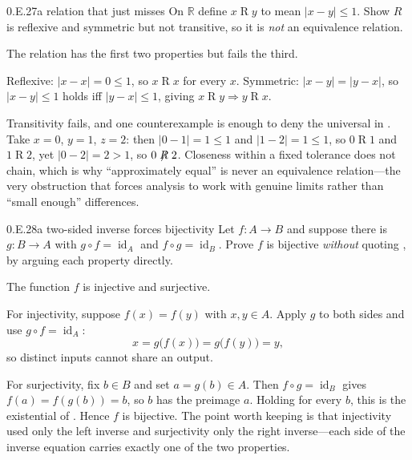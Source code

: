 \documentclass[main.tex]{subfiles}
\begin{document}
\begin{Exercise}{0.E.27}{a relation that just misses}
On $\mathbb R$ define $x\mathrel R y$ to mean $|x-y|\le 1$. Show $R$ is reflexive and symmetric but not
transitive, so it is \emph{not} an equivalence relation.
\end{Exercise}
\begin{Solution}
The relation has the first two properties but fails the third.

Reflexive: $|x-x|=0\le 1$, so $x\mathrel R x$ for every $x$. Symmetric: $|x-y|=|y-x|$, so
$|x-y|\le 1$ holds iff $|y-x|\le 1$, giving $x\mathrel R y\Rightarrow y\mathrel R x$.

Transitivity fails, and one counterexample is enough to deny the universal in . Take
$x=0$, $y=1$, $z=2$: then $|0-1|=1\le 1$ and $|1-2|=1\le 1$, so $0\mathrel R 1$ and $1\mathrel R 2$, yet
$|0-2|=2>1$, so $0\not\mathrel R 2$. Closeness within a fixed tolerance does not chain, which is why
``approximately equal'' is never an equivalence relation---the very obstruction that forces analysis to
work with genuine limits rather than ``small enough'' differences.
\end{Solution}

\begin{Exercise}{0.E.28}{a two-sided inverse forces bijectivity}
Let $f\colon A\to B$ and suppose there is $g\colon B\to A$ with $g\circ f=\operatorname{id}_A$ and
$f\circ g=\operatorname{id}_B$. Prove $f$ is bijective \emph{without} quoting , by
arguing each property directly.
\end{Exercise}
\begin{Solution}
The function $f$ is injective and surjective.

For injectivity, suppose $f(x)=f(y)$ with $x,y\in A$. Apply $g$ to both sides and use
$g\circ f=\operatorname{id}_A$:
\[
x=g\bigl(f(x)\bigr)=g\bigl(f(y)\bigr)=y,
\]
so distinct inputs cannot share an output.

For surjectivity, fix $b\in B$ and set $a=g(b)\in A$. Then $f\circ g=\operatorname{id}_B$ gives
$f(a)=f(g(b))=b$, so $b$ has the preimage $a$. Holding for every $b$, this is the existential of
. Hence $f$ is bijective. The point worth keeping is that injectivity used only the left
inverse and surjectivity only the right inverse---each side of the inverse equation carries exactly one
of the two properties.
\end{Solution}
\end{document}
